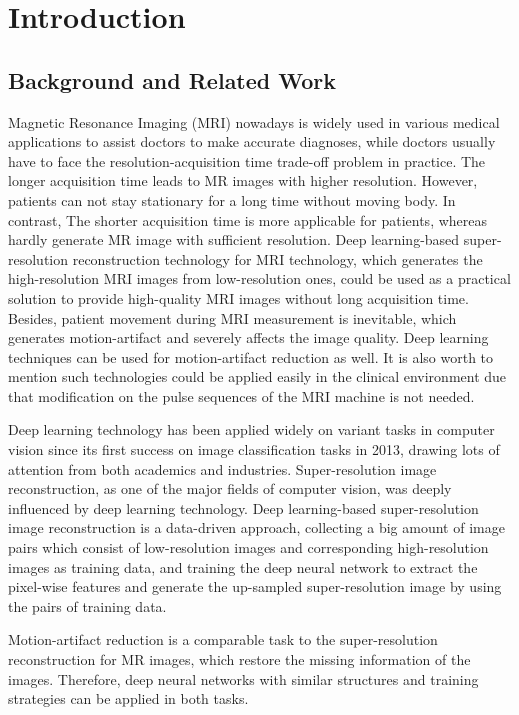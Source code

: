 \documentclass[runningheads]{llncs}
\begin{document}
\section{Introduction}
\subsection{Background and Related Work}
Magnetic Resonance Imaging (MRI) nowadays is widely used in various medical applications to assist doctors to make accurate diagnoses, while doctors usually have to face the resolution-acquisition time trade-off problem in practice. The longer acquisition time leads to MR images with higher resolution. However, patients can not stay stationary for a long time without moving body. In contrast, The shorter acquisition time is more applicable for patients, whereas hardly generate MR image with sufficient resolution. Deep learning-based super-resolution reconstruction technology for MRI technology, which generates the high-resolution MRI images from low-resolution ones, could be used as a practical solution to provide high-quality MRI images without long acquisition time. Besides, patient movement during MRI measurement is inevitable, which generates motion-artifact and severely affects the image quality. Deep learning techniques can be used for motion-artifact reduction as well. It is also worth to mention such technologies could be applied easily in the clinical environment due that modification on the pulse sequences of the MRI machine is not needed.

Deep learning technology has been applied widely on variant tasks in computer vision since its first success on image classification tasks in 2013, drawing lots of attention from both academics and industries. Super-resolution image reconstruction, as one of the major fields of computer vision, was deeply influenced by deep learning technology. Deep learning-based super-resolution image reconstruction is a data-driven approach, collecting a big amount of image pairs which consist of low-resolution images and corresponding high-resolution images as training data, and training the deep neural network to extract the pixel-wise features and generate the up-sampled super-resolution image by using the pairs of training data.

Motion-artifact reduction is a comparable task to the super-resolution reconstruction for MR images, which restore the missing information of the images. Therefore, deep neural networks with similar structures and training strategies can be applied in both tasks.
\end{document}
